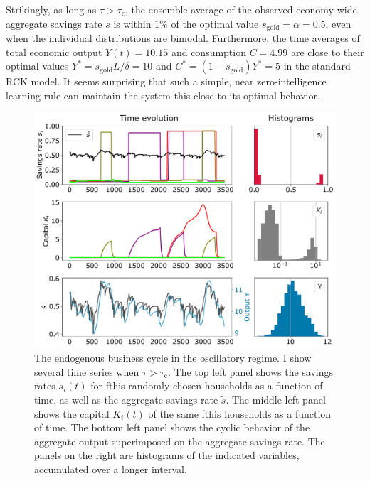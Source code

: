 Strikingly, as long as $\tau \! > \! \tau_{c}$, the ensemble average of the observed economy wide aggregate savings rate $\tilde{s}$ is within $1\%$ of the optimal value $s_\mathrm{gold}=\alpha=0.5$, even when the individual distributions are bimodal.
Furthermore, the time averages of total economic output $Y(t) \!=\! 10.15$ and  consumption $C \! = \! 4.99$ are close to their optimal values $Y^\ast \! = \! s_\mathrm{gold} L/\delta \! = \! 10$  and $C^\ast \! = \! (1-s_\mathrm{gold})Y^\ast \! = \! 5$  in the standard RCK model.  It seems surprising that such a simple, near zero-intelligence learning rule can maintain the system this close to its optimal behavior.
\begin{figure}[t]
     \centering
       \includegraphics[width=0.99\linewidth]
       {figures/fig2.pdf}
	\caption{{ The endogenous business cycle in the oscillatory regime}.   I show several time series when $\tau \!>\! \tau_\mathrm{c}$.  
	The top left panel shows the savings rates $s_i(t)$ for fthis randomly chosen households as a function of time, as well as the aggregate savings rate $\tilde{s}$.  
	The middle left panel shows the capital $K_i(t)$ of the same fthis households as a function of time. The bottom left panel shows the cyclic behavior of the aggregate output superimposed on the aggregate savings rate.  The panels on the right are histograms of the indicated variables, accumulated over a longer interval.}
   \label{fig:micro_trajs}
\end{figure}

